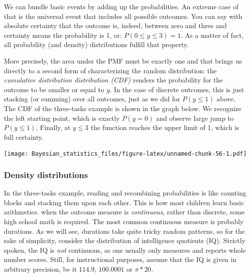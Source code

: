 \documentclass[]{svmono}
\newenvironment{Shaded}{\begin{snugshade}}{\end{snugshade}}
\newcommand{\KeywordTok}[1]{\textcolor[rgb]{0.13,0.29,0.53}{\textbf{#1}}}
\newcommand{\DataTypeTok}[1]{\textcolor[rgb]{0.13,0.29,0.53}{#1}}
\newcommand{\DecValTok}[1]{\textcolor[rgb]{0.00,0.00,0.81}{#1}}
\newcommand{\StringTok}[1]{\textcolor[rgb]{0.31,0.60,0.02}{#1}}
\newcommand{\OperatorTok}[1]{\textcolor[rgb]{0.81,0.36,0.00}{\textbf{#1}}}
\newcommand{\NormalTok}[1]{#1}
\theoremstyle{definition}
\theoremstyle{definition}
\theoremstyle{definition}
\theoremstyle{remark}
\begin{document}
We can bundle basic events by adding up the probabilities. An extreme
case of that is the universal event that includes all possible outcomes.
You can say with absolute certainty that the outcome is, indeed, between
zero and three and certainty means the probability is 1, or:
\(P(0 \leq y \leq 3) = 1\). As a matter of fact, all probability (and
density) distributions fulfill that property.

More precisely, the area under the PMF must be exactly one and that
brings us directly to a second form of characterizing the random
distribution: the \emph{cumulative distribution distribution (CDF)}
renders the probability for the outcome to be smaller or equal to \(y\).
In the case of discrete outcomes, this is just stacking (or summing)
over all outcomes, just as we did for \(P(y\leq1)\) above. The CDF of
the three-tasks example is shown in the graph below. We recognize the
left starting point, which is exactly \(P(y = 0)\) and observe large
jump to \(P(y \leq 1)\). Finally, at \(y \leq 3\) the function reaches
the upper limit of 1, which is full certainty.

\begin{Shaded}
\end{Shaded}

\texttt{[image: Bayesian\_statistics\_files/figure-latex/unnamed-chunk-56-1.pdf]}

\subsubsection{Density distributions}\label{density-distributions}

In the three-tasks example, reading and recombining probabilities is
like counting blocks and stacking them upon each other. This is how most
children learn basic arithmetics. when the outcome measure is
\emph{continuous}, rather than discrete, some high school math is
required. The most common continuous measure is probably durations. As
we will see, durations take quite tricky random patterns, so for the
sake of simplicity, consider the distribution of intelligence quotients
(IQ). Strictly spoken, the IQ is \emph{not} continuous, as one usually
only measures and reports whole number scores. Still, for instructional
purposes, assume that the IQ is given in arbitrary precision, be it
\(114.9\), \(100.0001\) or \(\pi * 20\).
\end{document}
